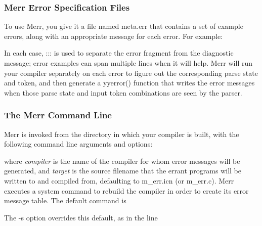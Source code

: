 \subsubsection{Merr Error Specification Files}

To use Merr, you give it a file named \textsf{meta.err} that contains a
set of example errors, along with an appropriate message for each
error. For example:


In each case, \textsf{:::} is used to separate the error fragment from
the diagnostic message; error examples can span multiple lines when it
will help. Merr will run your compiler separately on each error to
figure out the corresponding parse state and token, and then generate a
yyerror() function that writes the error messages when those parse
state and input token combinations are seen by the parser.

\subsubsection{The Merr Command Line}

Merr is invoked from the directory in which your compiler is built, with
the following command line arguments and options:


\noindent
where \textit{compiler} is the name of the compiler for whom error
messages will be generated, and \textit{target} is the source filename
that the errant programs will be written to and compiled from,
defaulting to \textsf{m\_err.icn} (or \textsf{m\_err.c}). Merr executes
a system command to rebuild the compiler in order to create its error
message table. The default command is


The \textsf{{}-s} option overrides this default, as in the line


